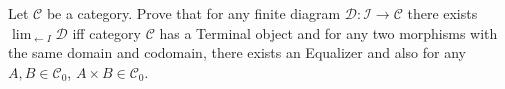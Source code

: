 Let $\mathcal{C}$ be a category. Prove that for any finite diagram $\mathcal{D}: \mathcal I \to \mathcal{C}$
there exists $\lim_{\leftarrow I} \mathcal D$ iff category $\mathcal C$ has a Terminal object and for any two morphisms with the same domain and codomain, there exists an Equalizer and also for any $A, B \in \mathcal C_0$, $A\times B \in \mathcal C_0$.